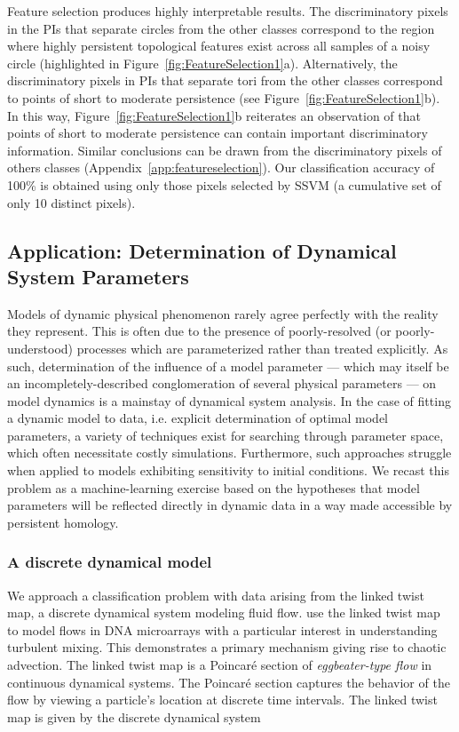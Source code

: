 \documentclass[11pt]{article}
\begin{document}
Feature selection produces highly interpretable results. The discriminatory pixels in the  PIs that separate circles from the other classes correspond to the region where highly persistent  topological features exist across all samples of a noisy circle (highlighted in Figure~\ref{fig:FeatureSelection1}a). Alternatively, the discriminatory pixels in  PIs that separate tori from the other classes correspond to points of short to moderate persistence (see Figure~\ref{fig:FeatureSelection1}b). In this way, Figure~\ref{fig:FeatureSelection1}b reiterates an observation of \citet{bendich2014persistent} that points of short to moderate persistence can contain important discriminatory information. Similar conclusions can be drawn from the discriminatory pixels of others classes (Appendix~\ref{app:featureselection}). Our classification accuracy of 100\% is obtained using only those pixels selected by SSVM (a cumulative set of only 10 distinct pixels).

\subsection{Application: Determination of Dynamical System Parameters}

Models of dynamic physical phenomenon rarely agree perfectly with the reality they represent.  This is often due to the presence of poorly-resolved (or poorly-understood) processes which are parameterized rather than treated explicitly.  As such, determination of the influence of a model parameter --- which may itself be an incompletely-described conglomeration of several physical parameters --- on model dynamics is a mainstay of dynamical system analysis.  In the case of fitting a dynamic model to data, i.e. explicit determination of optimal model parameters, a variety of techniques exist for searching through parameter space, which often necessitate costly simulations.  Furthermore, such approaches struggle when applied to models exhibiting sensitivity to initial conditions.  We recast this problem as a machine-learning exercise based on the hypotheses that model parameters will be reflected directly in dynamic data in a way made accessible by persistent homology.

\subsubsection{A discrete dynamical model} \label{sec:linkedtwist}
We approach a classification problem with data arising from the linked twist map, a discrete dynamical system modeling fluid flow. \citet{DNAHertzsch} use the linked twist map to model flows in DNA microarrays with a particular interest in understanding turbulent mixing. This demonstrates a primary mechanism giving rise to chaotic advection. The linked twist map is a Poincar\'e section of \textit{eggbeater-type flow} \citep{DNAHertzsch} in continuous dynamical systems.  The Poincar\'e section captures the behavior of the flow by viewing a particle's location at discrete time intervals.  The linked twist map is given by the discrete dynamical system
\end{document}
